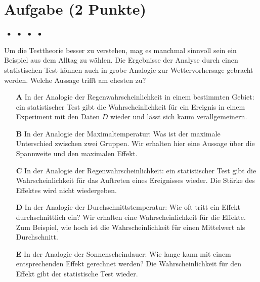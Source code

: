\documentclass[a4paper, 9pt]{scrartcl}\usepackage[]{graphicx}\usepackage[]{xcolor}
\begin{document}
\section{Aufgabe \hfill (2 Punkte)}

\ifcollection
\begin{flushright}
\tiny\vspace{-2Ex}
\textbf{\examinhaltstart}
\exammodulemathstat $\;\bullet$
\exammodulestat $\;\bullet$
\exammodulestatbbv $\;\bullet$
\exammodulestatversuch $\;\bullet$
\exammodulebiostat
\vspace{-1Ex}
\end{flushright}
\fi




Um die Testtheorie besser zu verstehen, mag es manchmal sinnvoll sein ein Beispiel aus dem Alltag zu wählen. Die Ergebnisse der Analyse durch einen statistischen Test können auch in grobe Analogie zur Wettervorhersage gebracht werden. Welche Aussage trifft am ehesten zu?



\begin{enumerate}
\item [\textbf{A} \msquare] In der Analogie der Regenwahrscheinlichkeit in einem bestimmten Gebiet: ein statistischer Test gibt die Wahrscheinlichkeit für ein Ereignis in einem Experiment mit den Daten $D$ wieder und lässt sich kaum verallgemeinern.
\item [\textbf{B} \msquare] In der Analogie der Maximaltemperatur: Was ist der maximale Unterschied zwischen zwei Gruppen. Wir erhalten hier eine Aussage über die Spannweite und den maximalen Effekt.
\item [\textbf{C} \msquare] In der Analogie der Regenwahrscheinlichkeit: ein statistischer Test gibt die Wahrscheinlichkeit für das Auftreten eines Ereignisses wieder. Die Stärke des Effektes wird nicht wiedergeben.
\item [\textbf{D} \msquare] In der Analogie der Durchschnittstemperatur: Wie oft tritt ein Effekt durchschnittlich ein? Wir erhalten eine Wahrscheinlichkeit für die Effekte. Zum Beispiel, wie hoch ist die Wahrscheinlichkeit für einen Mittelwert als Durchschnitt.
\item [\textbf{E} \msquare] In der Analogie der Sonnenscheindauer: Wie lange kann mit einem entsprechenden Effekt gerechnet werden? Die Wahrscheinlichkeit für den Effekt gibt der statistische Test wieder.
\end{enumerate}
\end{document}
